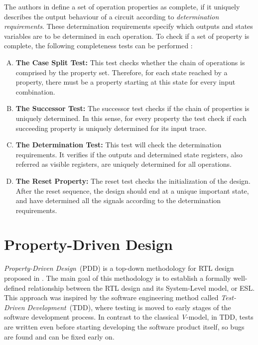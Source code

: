 The authors in \cite{paper-gapfree} define a set of operation properties as complete, if it uniquely describes the output behaviour of a circuit according to \textit{determination requirements}. These determination requirements specify which outputs and states variables are to be determined in each operation. To check if a set of property is complete, the following completeness tests can be performed \cite{guide-onespin}:

\begin{enumerate}[A.]
    \item \textbf{The Case Split Test:} This test checks whether the chain of operations is comprised by the property set. Therefore, for each state reached by a property, there must be a property starting at this state for every input combination.
    \item \textbf{The Successor Test:} The successor test checks if the chain of properties is uniquely determined. In this sense, for every property the test check if each succeeding property is uniquely determined for its input trace.
    \item \textbf{The Determination Test:} This test will check the determination requirements. It verifies if the outputs and determined state registers, also referred as visible registers, are uniquely determined for all operations.
    \item \textbf{The Reset Property:} The reset test checks the initialization of the design. After the reset sequence, the design should end at a unique important state, and have determined all the signals according to the determination requirements.
\end{enumerate}


\section{Property-Driven Design}
\label{section:PDD}

\textit{Property-Driven Design}~(PDD) is a top-down methodology for RTL design proposed in \cite{paper-pdd}. The main goal of this methodology is to establish a formally well-defined relationship between the RTL design and its System-Level model, or ESL. This approach was inspired by the software engineering method called \textit{Test-Driven Development}~(TDD), where testing is moved to early stages of the software development process. In contrast to the classical \textit{V}-model, in TDD, tests are written even before starting developing the software product itself, so bugs are found and can be fixed early on. 

